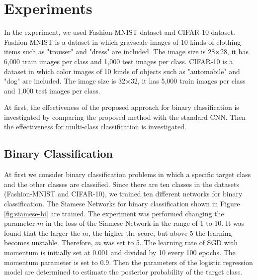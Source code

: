\documentclass[runningheads,a4paper]{llncs}
\begin{document}
\section{Experiments}
\label{sec:experiments}

In the experiment, we used Fashion-MNIST dataset and CIFAR-10 dataset.
Fashion-MNIST is a dataset in which grayscale images of 10 kinds of clothing items such as "trouser" and "dress" are included.
The image size is 28$\times$28, it has 6,000 train images per class and 1,000 test images per class.
CIFAR-10 is a dataset in which color images of 10 kinds of objects such as "automobile" and "dog" are included.
The image size is 32$\times$32, it has 5,000 train images per class and 1,000 test images per class.


At first, the effectiveness of the proposed approach for binary classification is investigated by comparing the proposed method with the standard CNN. Then the effectiveness for multi-class classification is investigated.






\subsection{Binary Classification}

At first we consider binary classification problems in which a specific target class and the other classes are classified.
Since there are ten classes in the datasets (Fashion-MNIST and CIFAR-10), we trained ten different networks for binary classification.
The Siamese Networks for binary classification shown in Figure \ref{fig:siamese-bi} are trained.
The experiment was performed changing the parameter $m$ in the loss of the Siamese Network in the range of 1 to 10.
It was found that the larger the $m$, the higher the score, but above 5 the learning becomes unstable.
Therefore, $m$ was set to 5.
The learning rate of SGD with momentum is initially set at 0.001 and divided by 10 every 100 epochs.
The momentum parameter is set to 0.9.
Then the parameters of the logistic regression model are determined to estimate the posterior probability of the target class.
\end{document}
